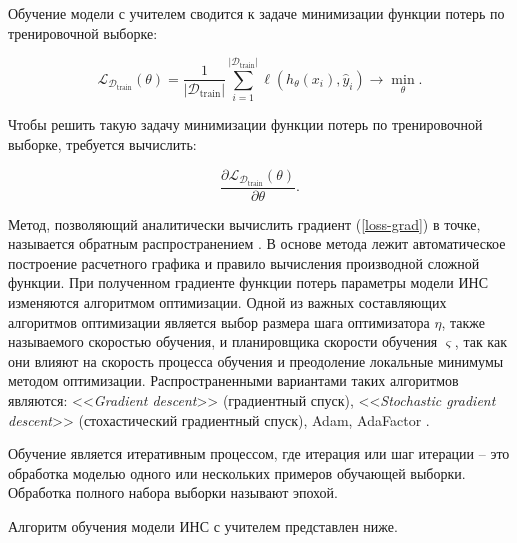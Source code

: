Обучение модели с учителем сводится к задаче минимизации функции потерь по тренировочной выборке:

\begin{equation}
    \mathcal{L}_{\mathcal{D}_{\text{train}}}(\theta) = \frac{1}{\lvert \mathcal{D}_{\text{train}} \rvert}\sum_{i=1}^{\lvert \mathcal{D}_{\text{train}} \rvert}\ell(h_{\theta}(x_i),\hat y_i) \rightarrow \min_{\theta}.
\end{equation}

Чтобы решить такую задачу минимизации функции потерь по тренировочной выборке, требуется вычислить:

\begin{equation}
    \frac{\partial \mathcal{L}_{\mathcal{D}_{\text{train}}}(\theta)}{\partial \theta}.
    \label{loss-grad}
\end{equation}

Метод, позволяющий аналитически вычислить градиент (\ref{loss-grad}) в точке, называется обратным распространением \cite{backprop-theory}. В основе метода лежит автоматическое построение расчетного графика и правило вычисления производной сложной функции. При полученном градиенте функции потерь параметры модели ИНС изменяются алгоритмом оптимизации. Одной из важных составляющих алгоритмов оптимизации является выбор размера шага оптимизатора $\eta$, также называемого скоростью обучения, и планировщика скорости обучения $\varsigma$, так как они влияют на скорость процесса обучения и преодоление локальные минимумы методом оптимизации. Распространенными вариантами таких алгоритмов являются: <<\textit{Gradient descent}>> (градиентный спуск), <<\textit{Stochastic gradient descent}>> (стохастический градиентный спуск), Adam, AdaFactor \cite{optimizers-paper,adafactor-paper}.

Обучение является итеративным процессом, где итерация или шаг итерации -- это обработка моделью одного или нескольких примеров обучающей выборки. Обработка полного набора выборки называют эпохой.

Алгоритм обучения модели ИНС с учителем представлен ниже.

